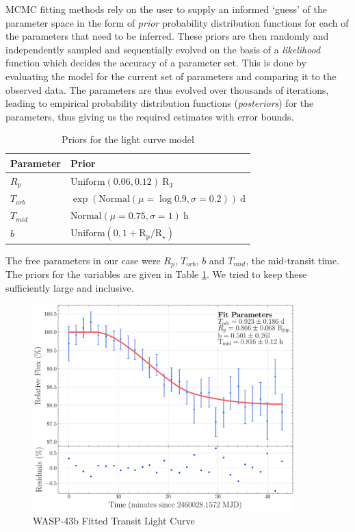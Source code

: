 \documentclass[12pt]{article}
\begin{document}
MCMC fitting methods rely on the user to supply an informed `guess' of the parameter space in the form of \textit{prior} probability distribution functions for each of the parameters that need to be inferred. These priors are then randomly and independently sampled and sequentially evolved on the basis of a \textit{likelihood} function which decides the accuracy of a parameter set. This is done by evaluating the model for the current set of parameters and comparing it to the observed data. The parameters are thus evolved over thousands of iterations, leading to empirical probability distribution functions (\textit{posteriors}) for the parameters, thus giving us the required estimates with error bounds.

\begin{table}[h]
    \centering
    \begin{tabular}{l|l}
    \hline
    \textbf{Parameter}   & \textbf{Prior}          \\
    \hline
    $R_p$   &       $\mathrm{Uniform}(0.06 ,0.12) \ \mathrm{R_J}$         \\ \hline
    $T_{orb}$   &       $ \exp{\left(\mathrm{Normal}(\mu = \log{0.9}, \sigma = 0.2)\right)} \ \mathrm{d} $     \\ \hline
    $T_{mid}$   &       $\mathrm{Normal}(\mu = 0.75, \sigma = 1) \ \mathrm{h}$         \\ \hline
    $b$   &       $\mathrm{Uniform}(0 ,1 + \mathrm{R_p/R_{\star}})$         \\ \hline

    
    \end{tabular}
    \caption{Priors for the light curve model} \label{priors}
\end{table}

The free parameters in our case were $R_p$, $T_{orb}$, $b$ and $T_{mid}$, the mid-transit time. The priors for the variables are given in Table \ref{priors}. We tried to keep these sufficiently large and inclusive.

\begin{figure}[h]
    \centering
    \includegraphics[width = 0.9\textwidth]{images/fit.pdf}
    \caption{WASP-43b Fitted Transit Light Curve}
    \label{fit}
\end{figure}
\end{document}
